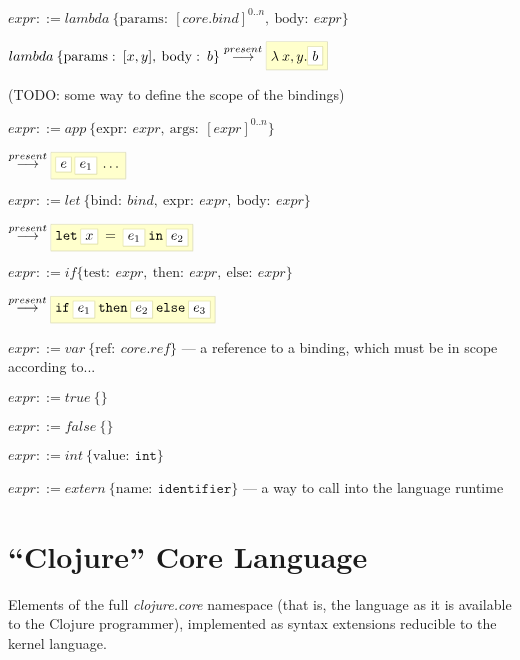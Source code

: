 \documentclass[110pt]{amsart}
\newcommand{\keyword}[1]{\ensuremath{\mathtt{#1}}}
\newcommand{\embed}[1]{\ensuremath{\fcolorbox{literal}{literalbg}{\ensuremath{#1}}}}
\newcommand{\unbed}[1]{\ensuremath{\fcolorbox{literal}{white}{\ensuremath{#1}}}}
\newcommand{\quoted}[1]{\ensuremath{\fcolorbox{literal}{literalbg}{\ensuremath{#1}}}}
\newcommand{\unquoted}[1]{\ensuremath{\fcolorbox{literal}{white}{\ensuremath{#1}}}}
\newcommand{\node}[2]{\ensuremath{#1 \: \{ #2 \}}}
\newcommand{\attr}[2]{\ensuremath{\mathrm{#1} : \: #2}}
\newcommand{\reducep}{\ensuremath{\overset{present}{\longrightarrow}}}
\begin{document}
\vspace{12pt}

$expr ::= \node{lambda}{\attr{params}{[ core.bind ]^{0..n}}, \: \attr{body}{expr}}$

$\node{lambda}{\attr{params}{[x, y]}, \: \attr{body}{b}}
\reducep 
\quoted{\lambda \: x, y . \unquoted{b}}$

(TODO: some way to define the scope of the bindings)


\vspace{12pt}

$expr ::= \node{app}{\attr{expr}{expr}, \: \attr{args}{[ expr ]^{0..n}}}$

$\reducep \quoted{\unquoted{e} \: \unquoted{e_1} \: \dots }$


\vspace{12pt}

$expr ::= \node{let}{\attr{bind}{bind}, \: \attr{expr}{expr}, \: \attr{body}{expr}}$

$\reducep \quoted{\keyword{let} \: \unquoted{x} \: = \: \unquoted{e_1} \: \keyword{in} \:\unquoted{e_2}}$

\vspace{12pt}

$expr ::= if \{ \attr{test}{expr}, \: \attr{then}{expr}, \: \attr{else}{expr} \}$

$\reducep \embed{\keyword{if} \: \unbed{e_1} \: \keyword{then} \: \unbed{e_2} \: \keyword{else} \: \unbed{e_3}}$


\vspace{12pt}

$expr ::= \node{var}{\attr{ref}{core.ref}}$  --- a reference to a binding, which must be in scope according to...


\vspace{12pt}

$expr ::= \node{true}{}$

$expr ::= \node{false}{}$

$expr ::= \node{int}{\attr{value}{\keyword{int}}}$


\vspace{12pt}

$expr ::= \node{extern}{\attr{name}{\keyword{identifier}}}$  --- a way to call into the language runtime



\section{``Clojure'' Core Language}
Elements of the full \emph{clojure.core} namespace (that is, the language as it is available to the Clojure programmer), implemented as syntax extensions reducible to the kernel language.
\end{document}
